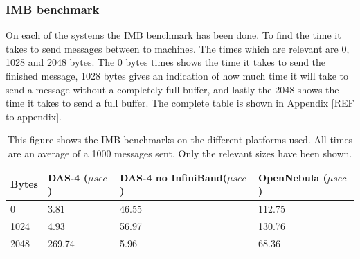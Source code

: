 \subsubsection{IMB benchmark}
On each of the systems the IMB benchmark has been done. To find the time it takes to send messages between to machines. The times which are relevant are 0, 1028 and 2048 bytes. The 0 bytes times shows the time it takes to send the finished message, 1028 bytes gives an indication of how much time it will take to send a message without a completely full buffer, and lastly the 2048 shows the time it takes to send a full buffer. The complete table is shown in Appendix [REF to appendix].
\begin{table}[!h]
\begin{tabular}{|l|l|l|l|}
\hline
Bytes & DAS-4 ($\mu sec$) & DAS-4 no InfiniBand($\mu sec$) & OpenNebula ($\mu sec$)\\ \hline
0 & 3.81 &  46.55  & 112.75  \\ \hline
1024 & 4.93 & 56.97  &  130.76 \\ \hline 
2048 & 269.74 & 5.96 & 68.36 \\ \hline
\end{tabular}
\caption{This figure shows the IMB benchmarks on the different platforms used. All times are an average of a 1000 messages sent. Only the relevant sizes have been shown.}
\label{tab:imb_bench}
\end{table}

